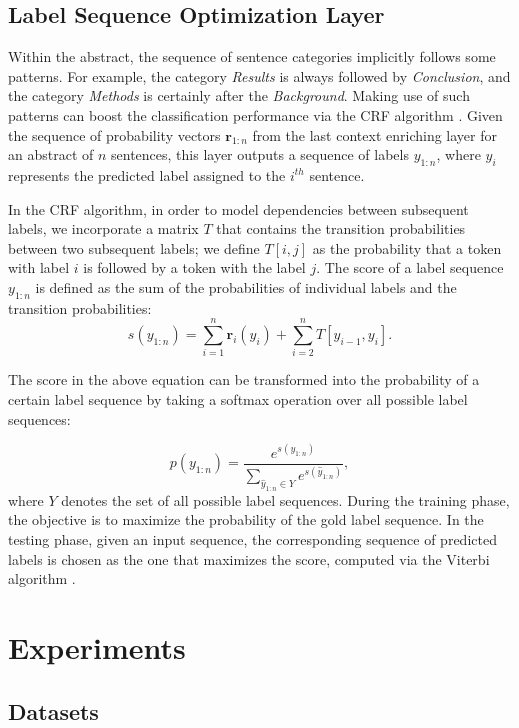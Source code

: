 \documentclass[11pt,a4paper]{article}
\renewcommand{\vec}{\boldsymbol}
\begin{document}
\subsection{Label Sequence Optimization Layer}

Within the abstract, the sequence of sentence categories implicitly follows some patterns. For example, the category \textit{Results} is always followed by \textit{Conclusion}, and the category \textit{Methods} is certainly after the \textit{Background}. Making use of such patterns can boost the classification performance via the CRF algorithm \cite{Lample2016NeuralAF}. Given the sequence of probability vectors $\vec{r}_{1:n}$ from the last context enriching layer for an abstract of $n$ sentences, this layer outputs a sequence of labels $y_{1:n}$, where $y_i$ represents the predicted label assigned to the $i^{th}$ sentence.


In the CRF algorithm, in order to model dependencies between subsequent labels, we incorporate a matrix $T$ that contains the transition probabilities between two subsequent labels; we define $T[i, j]$ as the probability that a token with label $i$ is followed by a token with the label $j$. The score of a label sequence $y_{1:n}$ is defined as the sum of the probabilities of individual labels and the transition probabilities:
\begin{equation}
s(y_{1:n})=\sum_{i=1}^n \vec{r}_i(y_i)+\sum_{i=2}^n T[y_{i-1}, y_i].
\end{equation}

The score in the above equation can be transformed into the probability of a certain label sequence by taking a softmax operation over all possible label sequences:

\begin{equation}
p(y_{1:n})=\frac{e^{s(y_{1:n})}}{\sum_{\hat{y}_{1:n}\in Y}e^{s(\hat{y}_{1:n})}},
\end{equation}
where $Y$ denotes the set of all possible label sequences. During the training phase, the objective is to maximize the probability of the gold label sequence. In the testing phase, given an input sequence, the corresponding sequence of predicted labels is chosen as the one that maximizes the score, computed via the Viterbi algorithm \cite{forney1973viterbi}.


\section{Experiments}

\subsection{Datasets}
\end{document}
